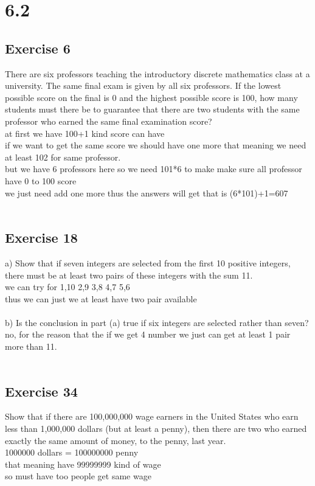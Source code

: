 \documentclass[12pt]{article}
\begin{document}
\section*{6.2}
\subsection*{Exercise 6}
There are six professors teaching the introductory discrete mathematics class at a university. 
   The same final exam is given by all six professors. If the lowest possible score on the final is 0 and the highest possible score is 100,
   how many students must there be to guarantee that there are two students with the same professor who earned the same final examination score?\\
at first we have 100+1 kind score can have\\
if we want to get the same score we should have one more that meaning we need at least 102 for same professor.\\
but we have 6 professors here so we need 101*6 to make make sure all professor have 0 to 100 score\\
we just need add one more thus the answers will get that is (6*101)+1=607\\
\\
\subsection*{Exercise 18}
a) Show that if seven integers are selected from the first 10 positive integers, there must be at least two pairs of these integers with the sum 11.\\
we can try for 1,10   2,9   3,8   4,7    5,6\\
thus we can just we at least have two pair available\\
\\
b) Is the conclusion in part (a) true if six integers are selected rather than seven?\\
no, for the reason that the if we get 4 number we just can get at least 1 pair more than 11.\\
\\
\subsection*{Exercise 34}
Show that if there are 100,000,000 wage earners in the United States who earn less than 1,000,000 dollars (but at least a penny), 
then there are two who earned exactly the same amount of money, to the penny, last year.\\
1000000 dollars = 100000000 penny\\
that meaning have 99999999 kind of wage\\
so must have too people get same wage\\
\\
\end{document}
